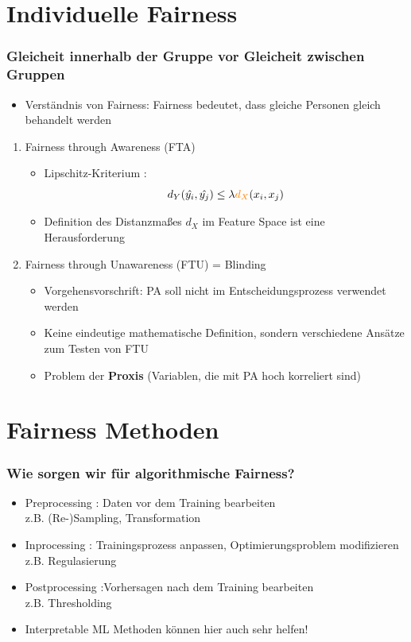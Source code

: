 \documentclass[aspectratio=169]{beamer}
\begin{document}
\section{Individuelle Fairness}
\begin{frame}
    \frametitle{Gleicheit innerhalb der Gruppe vor Gleicheit zwischen Gruppen}
	\begin{itemize}
		\item Verständnis von Fairness: Fairness bedeutet, dass gleiche Personen gleich behandelt werden
	\end{itemize}
    \begin{enumerate}
		\item<2-> Fairness through Awareness \cite{dwork2012} (FTA)
        \begin{itemize}
            \item<3-> Lipschitz-Kriterium \cite{castelnovo2022}:
            \[
            d_Y(\hat{y_i}, \hat{y_j}) \leq \lambda {\color{orange}{d_X}}(x_i, x_j)
            \] 
            \item<4-> Definition des {\color{orange}Distanzmaßes $d_X$} im Feature Space ist eine Herausforderung
        \end{itemize}
        \item<5-> Fairness through Unawareness (FTU) = Blinding
        \begin{itemize}
            \item<6-> Vorgehensvorschrift: PA soll nicht im Entscheidungsprozess verwendet werden
            \item<7-> Keine eindeutige mathematische Definition, sondern verschiedene Ansätze zum Testen von FTU
            \item<8-> Problem der \textbf{Proxis} (Variablen, die mit PA hoch korreliert sind)
        \end{itemize}
    \end{enumerate}
\end{frame}


\section{Fairness Methoden}
\begin{frame}
	\frametitle{Wie sorgen wir für algorithmische Fairness?}
	\begin{itemize}
		\item<1-> Preprocessing \cite{caton2024}: Daten vor dem Training bearbeiten \\ z.B. (Re-)Sampling, Transformation
		\item<2-> Inprocessing \cite{caton2024}: Trainingsprozess anpassen, Optimierungsproblem modifizieren \\ z.B. Regulasierung
		\item<3-> Postprocessing \cite{caton2024}:Vorhersagen nach dem Training bearbeiten \\ z.B. Thresholding
		\item<4-> Interpretable ML Methoden können hier auch sehr helfen!
	\end{itemize}
\end{frame}
\end{document}
